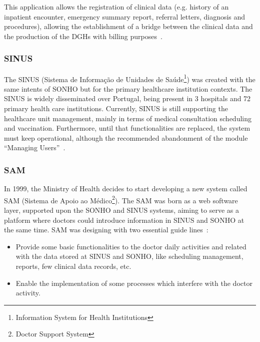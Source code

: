 This application allows the registration of clinical data (e.g. history of an inpatient encounter, emergency summary report, referral letters, diagnosis and procedures), allowing the establishment of a bridge between the clinical data and the production of the DGHs with billing purposes~\citep{GDHSONHO2011}.



\subsubsection{SINUS}

The SINUS (Sistema de Informação de Unidades de Saúde\footnote{Information System for Health Institutions}) was created with the same intents of SONHO but for the primary healthcare institution contexts. The SINUS is widely disseminated over Portugal, being present in 3 hospitals and 72 primary health care institutions. Currently, SINUS is still supporting the healthcare unit management, mainly in terms of medical consultation scheduling and vaccination. Furthermore, until that functionalities are replaced, the system must keep operational, although the recommended abandonment of the module ``Managing Users''~\citep{Saude2010}.


\subsubsection{SAM}


In 1999, the Ministry of Health decides to start developing a new system called SAM (Sistema de Apoio ao Médico\footnote{Doctor Support System}). The SAM was born as a web software layer, supported upon the SONHO and SINUS systems, aiming to serve as a platform where doctors could introduce information in SINUS and SONHO at the same time. SAM was designing with two essential guide lines~\citep{Castanheira2005, ACSS_SAM2010}:
\begin{itemize}
\item Provide some basic functionalities to the doctor daily activities and related with the data stored at SINUS and SONHO, like scheduling management, reports, few clinical data records, etc.
\item Enable the implementation of some processes which interfere with the doctor activity.
\end{itemize}


